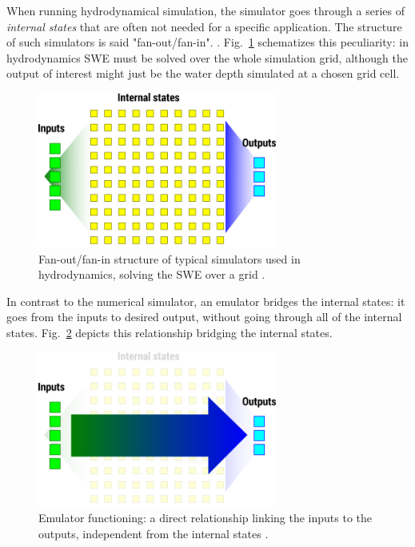 When running hydrodynamical simulation, the simulator goes through a series of \emph{internal states} that are often not needed for a specific application. The structure of such simulators is said "fan-out/fan-in". \autocite{carbajal_emumore_2017}. Fig.~\ref{fig:simulation} schematizes this peculiarity: in hydrodynamics SWE must be solved over the whole simulation grid, although the output of interest might just be the water depth simulated at a chosen grid cell.

\begin{figure}[h]
  \centering
  \includegraphics[width=0.7\textwidth]{Figures/simulation.png}
  \caption{Fan-out/fan-in structure of typical simulators used in hydrodynamics, solving the SWE over a grid \autocite{carbajal_emumore_2017}.}
  \label{fig:simulation}
\end{figure}

In contrast to the numerical simulator, an emulator bridges the internal states: it goes from the inputs to desired output, without going through all of the internal states.  Fig.~\ref{fig:emulation} depicts this relationship bridging the internal states.

\begin{figure}[h]
  \centering
  \includegraphics[width=0.7\textwidth]{Figures/emulation.png}
  \caption{Emulator functioning: a direct relationship linking the inputs to the outputs, independent from the internal states \autocite{carbajal_emumore_2017}.}
  \label{fig:emulation}
\end{figure}

